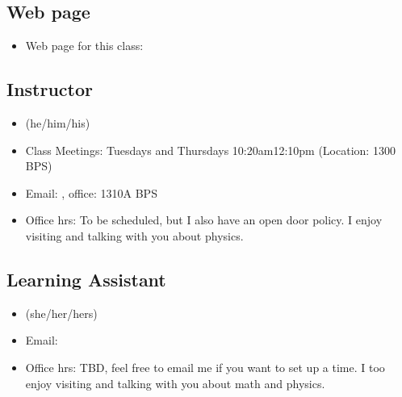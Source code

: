\documentclass[letterpaper,10pt,english]{jupyterBook}
\begin{document}
\subsection{Web page}
\label{\detokenize{content/0_course/syllabus:web-page}}\begin{itemize}
\item {} 
\sphinxAtStartPar
Web page for this class:

\end{itemize}


\subsection{Instructor}
\label{\detokenize{content/0_course/syllabus:instructor}}\begin{itemize}
\item {} 
\sphinxAtStartPar
{} (he/him/his)

\item {} 
\sphinxAtStartPar
Class Meetings: Tuesdays and Thursdays 10:20am\sphinxhyphen{}12:10pm (Location: 1300 BPS)

\item {} 
\sphinxAtStartPar
Email: , office: 1310\sphinxhyphen{}A BPS

\item {} 
\sphinxAtStartPar
Office hrs: To be scheduled, but I also have an open door policy. I enjoy visiting and talking with you about physics.

\end{itemize}


\subsection{Learning Assistant}
\label{\detokenize{content/0_course/syllabus:learning-assistant}}\begin{itemize}
\item {} 
\sphinxAtStartPar
{} (she/her/hers)

\item {} 
\sphinxAtStartPar
Email: 

\item {} 
\sphinxAtStartPar
Office hrs: TBD, feel free to email me if you want to set up a time. I too enjoy visiting and talking with you about math and physics.

\end{itemize}
\end{document}
